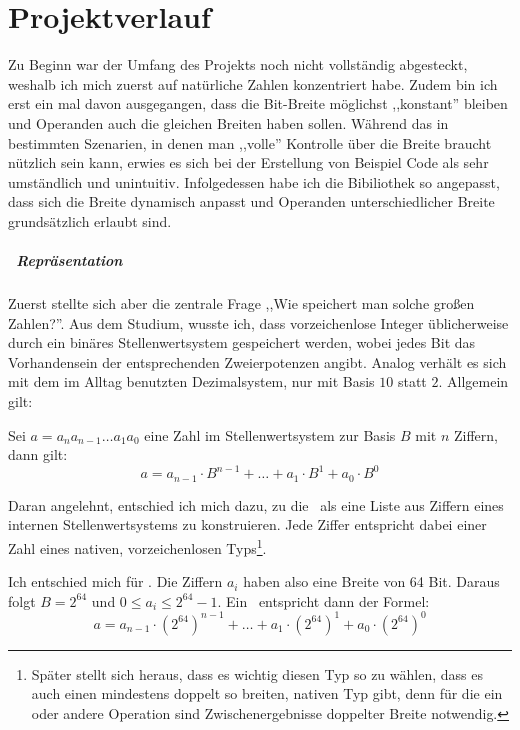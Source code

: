 \section{Projektverlauf}
Zu Beginn war der Umfang des Projekts noch nicht vollständig abgesteckt, weshalb ich mich zuerst auf natürliche Zahlen konzentriert habe. Zudem bin ich erst ein mal davon ausgegangen, dass die Bit-Breite möglichst ,,konstant'' bleiben und Operanden auch die gleichen Breiten haben sollen.
Während das in bestimmten Szenarien, in denen man ,,volle'' Kontrolle über die Breite braucht nützlich sein kann, erwies es sich bei der Erstellung von Beispiel Code als sehr umständlich und unintuitiv. Infolgedessen habe ich die Bibiliothek so angepasst, dass sich die Breite dynamisch anpasst und Operanden unterschiedlicher Breite grundsätzlich erlaubt sind.


\subparagraph*{\mpi\ Repräsentation}
Zuerst stellte sich aber die zentrale Frage ,,Wie speichert man solche großen Zahlen?''.
Aus dem Studium, wusste ich, dass vorzeichenlose Integer üblicherweise durch ein binäres Stellenwertsystem gespeichert werden, wobei jedes Bit das Vorhandensein der entsprechenden Zweierpotenzen angibt.
Analog verhält es sich mit dem im Alltag benutzten Dezimalsystem, nur mit Basis $10$ statt $2$. Allgemein gilt:

Sei $a=a_{n}a_{n-1}\dots{}a_{1}a_{0}$ eine Zahl im Stellenwertsystem zur Basis $B$ mit $n$ Ziffern, dann gilt:
\begin{equation}
a = a_{n-1} \cdot B^{n-1} + \dots{} + a_{1} \cdot B^{1} + a_{0} \cdot B^{0}
\end{equation}

Daran angelehnt, entschied ich mich dazu, zu die \mpi\ als eine Liste aus Ziffern eines internen Stellenwertsystems zu konstruieren.
Jede Ziffer entspricht dabei einer Zahl eines nativen, vorzeichenlosen Typs\footnote{Später stellt sich heraus, dass es wichtig diesen Typ so zu wählen, dass es auch einen mindestens doppelt so breiten, nativen Typ gibt, denn für die ein oder andere Operation sind Zwischenergebnisse doppelter Breite notwendig.}.


Ich entschied mich für . Die Ziffern $a_i$ haben also eine Breite von 64 Bit.
Daraus folgt $B = 2^{64}$ und $0 \le a_i \le 2^{64} - 1$.
Ein \mpi\ entspricht dann der Formel:
\begin{equation}
a = a_{n-1} \cdot (2^{64})^{n-1} + \dots{} + a_{1} \cdot (2^{64})^{1} + a_{0} \cdot (2^{64})^{0}
\end{equation}

